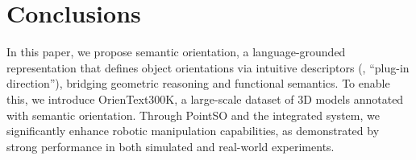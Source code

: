 \section{Conclusions}
In this paper, we propose semantic orientation, a language-grounded representation that defines object orientations via intuitive descriptors (\eg, ``plug-in direction''), bridging geometric reasoning and functional semantics. To enable this, we introduce OrienText300K, a large-scale dataset of 3D models annotated with semantic orientation. Through PointSO and the integrated \sofar system, we significantly enhance robotic manipulation capabilities, as demonstrated by strong performance in both simulated and real-world experiments.